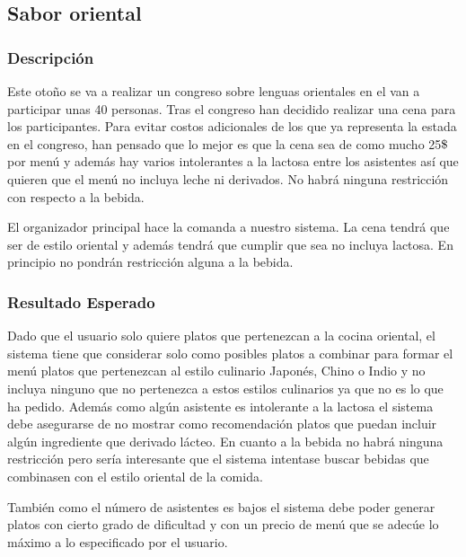 \documentclass{article}
\newcommand{\dollar}{\mbox{\textdollar}}
\begin{document}
\subsection{Sabor oriental}
\subsubsection{Descripción}
Este otoño se va a realizar un congreso sobre lenguas orientales en el van a participar unas 40 personas. Tras el congreso han decidido realizar una cena para los participantes. Para evitar costos adicionales de los que ya representa la estada en el congreso, han pensado que lo mejor es que la cena sea de como mucho 25$\dollar$ por menú y además hay varios intolerantes a la lactosa entre los asistentes así que quieren que el menú no incluya leche ni derivados. No habrá ninguna restricción con respecto a la bebida.
\par
El organizador principal hace la comanda a nuestro sistema. La cena tendrá que ser de estilo oriental y además tendrá que cumplir que sea no incluya lactosa. En principio no pondrán restricción alguna a la bebida.

\subsubsection{Resultado Esperado}
Dado que el usuario solo quiere platos que pertenezcan a la cocina oriental, el sistema tiene que considerar solo como posibles platos a combinar para formar el menú platos que pertenezcan al estilo culinario Japonés, Chino o Indio y no incluya ninguno que no pertenezca a estos estilos culinarios ya que no es lo que ha pedido. Además como algún asistente es intolerante a la lactosa el sistema debe asegurarse de no mostrar como recomendación platos que puedan incluir algún ingrediente que derivado lácteo. En cuanto a la bebida no habrá ninguna restricción pero sería interesante que el sistema intentase buscar bebidas que combinasen con el estilo oriental de la comida.
\par
También como el número de asistentes es bajos el sistema debe poder generar platos con cierto grado de dificultad y con un precio de menú que se adecúe lo máximo a lo especificado por el usuario.
\end{document}

